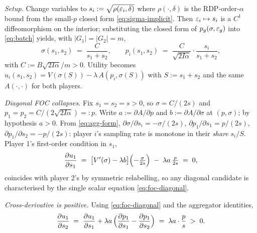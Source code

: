 \emph{Setup.} Change variables to $s_i := \sqrt{\rho(\varepsilon_i,
\delta)}$ where $\rho(\cdot,\delta)$ is the \ac{RDP}-order-$\alpha$ bound
from the small-$p$ closed form \eqref{eq:sigma-implicit}. Then $\varepsilon_i \mapsto s_i$
is a $C^1$ diffeomorphism on the interior; substituting the closed
form of $p_g(\sigma,\varepsilon_g)$ into \eqref{eq:batch} yields, with $|G_1| = |G_2| =
m$,
\begin{equation}
\sigma(s_1, s_2) \;=\; \frac{C}{s_1 + s_2},
\qquad
p_i(s_1, s_2) \;=\; \frac{C}{\sqrt{2 I \alpha}}\cdot\frac{s_i}{s_1 + s_2},
\label{eq:agg-form}
\end{equation}
with $C := B \sqrt{2 I \alpha}/m > 0$. Utility becomes $u_i(s_1,
s_2) = V(\sigma(S)) - \lambda\, A(p_i, \sigma(S))$ with $S := s_1 + s_2$
and the same $A(\cdot,\cdot)$ for both players.

\emph{Diagonal FOC collapses.} Fix $s_1 = s_2 = s > 0$, so $\sigma =
C/(2s)$ and $p_1 = p_2 = C/(2\sqrt{2 I\alpha}) =: p$. Write $a :=
\partial A / \partial p$ and $b := \partial A / \partial \sigma$ at
$(p,\sigma)$; by hypothesis $a > 0$. From \eqref{eq:agg-form},
$\partial \sigma/\partial s_i = -\sigma/(2s)$, $\partial p_1/\partial
s_1 = p/(2s)$, $\partial p_1/\partial s_2 = -p/(2s)$: player $i$'s
sampling rate is monotone in their \emph{share} $s_i/S$. Player 1's
first-order condition in $s_1$,
\begin{equation}
\frac{\partial u_1}{\partial s_1}
\;=\; \bigl[V'(\sigma) - \lambda b\bigr] \Bigl(-\tfrac{\sigma}{2 s}\Bigr)
    \;-\; \lambda a \,\tfrac{p}{2 s}
\;=\; 0,
\label{eq:foc-diagonal}
\end{equation}
coincides with player 2's by symmetric relabelling, so any diagonal
candidate is characterised by the single scalar equation
\eqref{eq:foc-diagonal}.

\emph{Cross-derivative is positive.} Using \eqref{eq:foc-diagonal}
and the aggregator identities,
\[
\frac{\partial u_1}{\partial s_2}
\;=\; \frac{\partial u_1}{\partial s_1}
   + \lambda a\, \Bigl(\frac{\partial p_1}{\partial s_1} - \frac{\partial
   p_1}{\partial s_2}\Bigr)
\;=\; \lambda a \cdot \frac{p}{s} \;>\; 0.
\]

